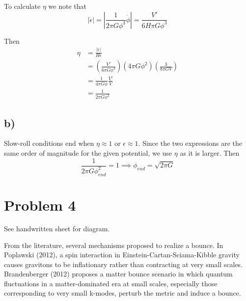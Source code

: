 \documentclass{article}
\begin{document}
To calculate $\eta$ we note that
\[|\dot{\epsilon}| = |\frac{1}{2\pi G \phi^3}\dot{\phi}| = \frac{V'}{6H\pi G\phi^3}\]

Then
\begin{align*}
\eta &= \frac{|\dot{\epsilon}|}{H\epsilon}\\
&= \left(\frac{V'}{6\pi G\phi^3}\right)\left(4\pi G\phi^2\right)\left(\frac{3}{8\pi GV}\right)\\
&=\frac{1}{4\pi G\phi}\frac{V'}{V}\\
&=\frac{1}{2\pi G\phi^2}
\end{align*}
\subsection*{b)}
Slow-roll conditions end when $\eta\approx 1$ or $\epsilon\approx 1$.  Since the two expressions are the same order of magnitude for the given potential, we use $\eta$ as it is larger. Then
\[\frac{1}{2\pi G\phi_{end}^2}=1\implies \phi_{end}= \sqrt{2\pi G}\]

\section*{Problem 4}

See handwritten sheet for diagram. 

From the literature, several mechanisms proposed to realize a bounce. In Poplawski (2012), a spin interaction in Einstein-Cartan-Sciama-Kibble gravity causes gravitons to be inflationary rather than contracting at very small scales. Brandenberger (2012) proposes a matter bounce scenario in which quantum fluctuations in a matter-dominated era at small scales, especially those corresponding to very small  k-modes, perturb the metric and induce a bounce.
\end{document}
